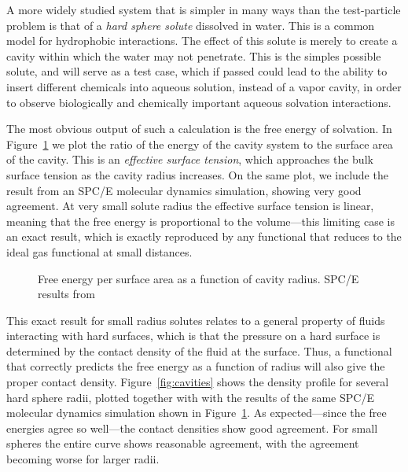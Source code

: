 \documentclass[letterpaper,twocolumn,amsmath,amssymb,prb]{revtex4-1}
\begin{document}
A more widely studied system that is simpler in many ways than the
test-particle problem is that of a \emph{hard sphere solute} dissolved
in water.  This is a common model for hydrophobic interactions.  The
effect of this solute is merely to create a cavity within which the
water may not penetrate.  This is the simples possible solute, and
will serve as a test case, which if passed could lead to the ability
to insert different chemicals into aqueous solution, instead of a
vapor cavity, in order to observe biologically and chemically
important aqueous solvation interactions.

The most obvious output of such a calculation is the free energy of
solvation.  In Figure~\ref{fig:surfaceTension} we plot the ratio of the
energy of the cavity system to the surface area of the cavity.  This
is an \emph{effective surface tension}, which approaches the bulk
surface tension as the cavity radius increases.  On the same plot, we
include the result from an SPC/E molecular dynamics
simulation\cite{huang2001shs}, showing very good agreement.  At very
small solute radius the effective surface tension is linear, meaning
that the free energy is proportional to the volume---this limiting
case is an exact result, which is exactly reproduced by any functional
that reduces to the ideal gas functional at small distances.

\begin{figure}
\begin{center}
\end{center}
\caption{Free energy per surface area as a function of cavity
  radius. SPC/E results from~\cite{huang2001shs}}
\label{fig:surfaceTension}
\end{figure}

This exact result for small radius solutes relates to a general property of
fluids interacting with hard surfaces, which is that the pressure on a hard
surface is determined by the contact density of the fluid at the surface.
Thus, a functional that correctly predicts the free energy as a function of
radius will also give the proper contact density.
Figure~\ref{fig:cavities} shows the density profile for several hard sphere
radii, plotted together with with the results of the same SPC/E molecular
dynamics simulation shown in
Figure~\ref{fig:surfaceTension}\cite{huang2001shs}.  As expected---since
the free energies agree so well---the contact densities show good
agreement.  For small spheres the entire curve shows reasonable agreement,
with the agreement becoming worse for larger radii.
\end{document}
